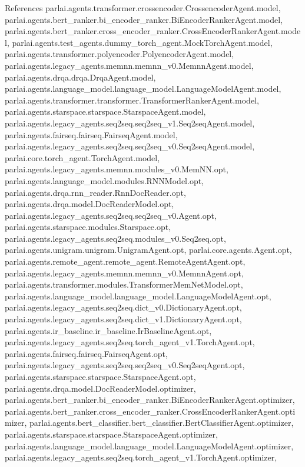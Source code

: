 References parlai.\+agents.\+transformer.\+crossencoder.\+Crossencoder\+Agent.\+model, parlai.\+agents.\+bert\+\_\+ranker.\+bi\+\_\+encoder\+\_\+ranker.\+Bi\+Encoder\+Ranker\+Agent.\+model, parlai.\+agents.\+bert\+\_\+ranker.\+cross\+\_\+encoder\+\_\+ranker.\+Cross\+Encoder\+Ranker\+Agent.\+model, parlai.\+agents.\+test\+\_\+agents.\+dummy\+\_\+torch\+\_\+agent.\+Mock\+Torch\+Agent.\+model, parlai.\+agents.\+transformer.\+polyencoder.\+Polyencoder\+Agent.\+model, parlai.\+agents.\+legacy\+\_\+agents.\+memnn.\+memnn\+\_\+v0.\+Memnn\+Agent.\+model, parlai.\+agents.\+drqa.\+drqa.\+Drqa\+Agent.\+model, parlai.\+agents.\+language\+\_\+model.\+language\+\_\+model.\+Language\+Model\+Agent.\+model, parlai.\+agents.\+transformer.\+transformer.\+Transformer\+Ranker\+Agent.\+model, parlai.\+agents.\+starspace.\+starspace.\+Starspace\+Agent.\+model, parlai.\+agents.\+legacy\+\_\+agents.\+seq2seq.\+seq2seq\+\_\+v1.\+Seq2seq\+Agent.\+model, parlai.\+agents.\+fairseq.\+fairseq.\+Fairseq\+Agent.\+model, parlai.\+agents.\+legacy\+\_\+agents.\+seq2seq.\+seq2seq\+\_\+v0.\+Seq2seq\+Agent.\+model, parlai.\+core.\+torch\+\_\+agent.\+Torch\+Agent.\+model, parlai.\+agents.\+legacy\+\_\+agents.\+memnn.\+modules\+\_\+v0.\+Mem\+N\+N.\+opt, parlai.\+agents.\+language\+\_\+model.\+modules.\+R\+N\+N\+Model.\+opt, parlai.\+agents.\+drqa.\+rnn\+\_\+reader.\+Rnn\+Doc\+Reader.\+opt, parlai.\+agents.\+drqa.\+model.\+Doc\+Reader\+Model.\+opt, parlai.\+agents.\+legacy\+\_\+agents.\+seq2seq.\+seq2seq\+\_\+v0.\+Agent.\+opt, parlai.\+agents.\+starspace.\+modules.\+Starspace.\+opt, parlai.\+agents.\+legacy\+\_\+agents.\+seq2seq.\+modules\+\_\+v0.\+Seq2seq.\+opt, parlai.\+agents.\+unigram.\+unigram.\+Unigram\+Agent.\+opt, parlai.\+core.\+agents.\+Agent.\+opt, parlai.\+agents.\+remote\+\_\+agent.\+remote\+\_\+agent.\+Remote\+Agent\+Agent.\+opt, parlai.\+agents.\+legacy\+\_\+agents.\+memnn.\+memnn\+\_\+v0.\+Memnn\+Agent.\+opt, parlai.\+agents.\+transformer.\+modules.\+Transformer\+Mem\+Net\+Model.\+opt, parlai.\+agents.\+language\+\_\+model.\+language\+\_\+model.\+Language\+Model\+Agent.\+opt, parlai.\+agents.\+legacy\+\_\+agents.\+seq2seq.\+dict\+\_\+v0.\+Dictionary\+Agent.\+opt, parlai.\+agents.\+legacy\+\_\+agents.\+seq2seq.\+dict\+\_\+v1.\+Dictionary\+Agent.\+opt, parlai.\+agents.\+ir\+\_\+baseline.\+ir\+\_\+baseline.\+Ir\+Baseline\+Agent.\+opt, parlai.\+agents.\+legacy\+\_\+agents.\+seq2seq.\+torch\+\_\+agent\+\_\+v1.\+Torch\+Agent.\+opt, parlai.\+agents.\+fairseq.\+fairseq.\+Fairseq\+Agent.\+opt, parlai.\+agents.\+legacy\+\_\+agents.\+seq2seq.\+seq2seq\+\_\+v0.\+Seq2seq\+Agent.\+opt, parlai.\+agents.\+starspace.\+starspace.\+Starspace\+Agent.\+opt, parlai.\+agents.\+drqa.\+model.\+Doc\+Reader\+Model.\+optimizer, parlai.\+agents.\+bert\+\_\+ranker.\+bi\+\_\+encoder\+\_\+ranker.\+Bi\+Encoder\+Ranker\+Agent.\+optimizer, parlai.\+agents.\+bert\+\_\+ranker.\+cross\+\_\+encoder\+\_\+ranker.\+Cross\+Encoder\+Ranker\+Agent.\+optimizer, parlai.\+agents.\+bert\+\_\+classifier.\+bert\+\_\+classifier.\+Bert\+Classifier\+Agent.\+optimizer, parlai.\+agents.\+starspace.\+starspace.\+Starspace\+Agent.\+optimizer, parlai.\+agents.\+language\+\_\+model.\+language\+\_\+model.\+Language\+Model\+Agent.\+optimizer, parlai.\+agents.\+legacy\+\_\+agents.\+seq2seq.\+torch\+\_\+agent\+\_\+v1.\+Torch\+Agent.\+optimizer, 
